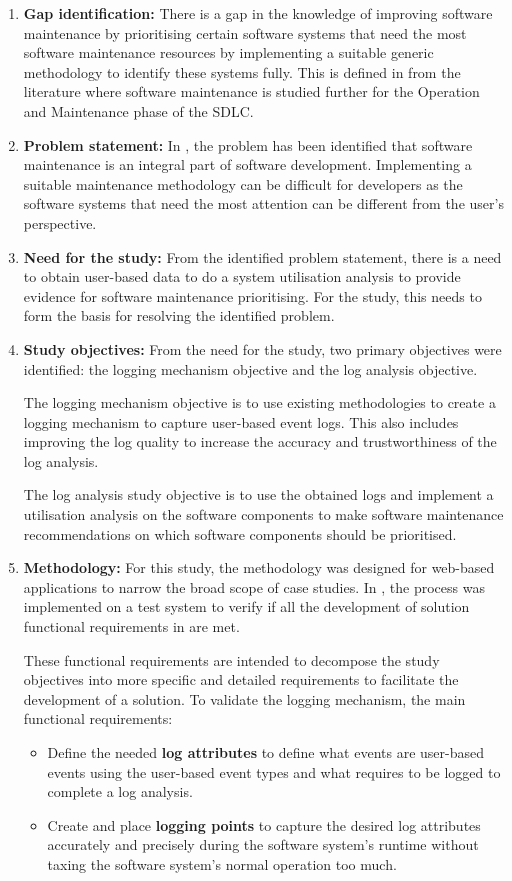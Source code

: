 \begin{enumerate}[label=\textbf{\Roman*.}]	
	\item \textbf{Gap identification:} There is a gap in the knowledge of improving software maintenance by prioritising certain software systems that need the most software maintenance resources by implementing a suitable generic methodology to identify these systems fully. This is defined in  from the literature where software maintenance is studied further for the Operation and Maintenance phase of the SDLC.
	\item \textbf{Problem statement:} In , the problem has been identified that software maintenance is an integral part of software development. Implementing a suitable maintenance methodology can be difficult for developers as the software systems that need the most attention can be different from the user's perspective.  
	\item \textbf{Need for the study:} From the identified problem statement, there is a need to obtain user-based data to do a system utilisation analysis to provide evidence for software maintenance prioritising. For the study, this needs to form the basis for resolving the identified problem.
	\item \textbf{Study objectives:} From the need for the study, two primary objectives were identified: the logging mechanism objective and the log analysis objective.\par The logging mechanism objective is to use existing methodologies to create a logging mechanism to capture user-based event logs. This also includes improving the log quality to increase the accuracy and trustworthiness of the log analysis.\par The log analysis study objective is to use the obtained logs and implement a utilisation analysis on the software components to make software maintenance recommendations on which software components should be prioritised.
	\item \textbf{Methodology:} For this study, the methodology was designed for web-based applications to narrow the broad scope of case studies. In , the process was implemented on a test system to verify if all the development of solution functional requirements in  are met.\par These functional requirements are intended to decompose the study objectives into more specific and detailed requirements to facilitate the development of a solution. To validate the logging mechanism, the main functional requirements:
	 \begin{itemize}
		\item Define the needed \textbf{log attributes} to define what events are user-based events using the user-based event types and what requires to be logged to complete a log analysis.
		\item Create and place \textbf{logging points} to capture the desired log attributes accurately and precisely during the software system's runtime without taxing the software system's normal operation too much.
	 \end{itemize}


\end{enumerate}
